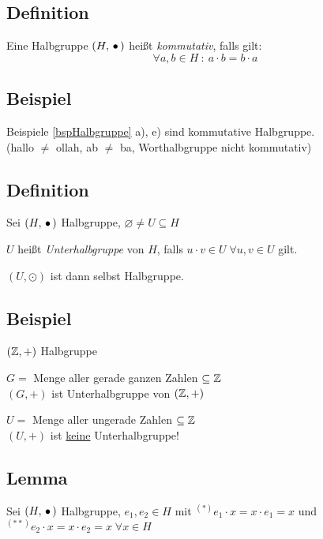  
 \subsection[Definition: kommutative Halbgruppe]{Definition}
 
 Eine Halbgruppe $(H, \,{\bullet}\,)$ heißt \emph{kommutativ}, falls gilt:
 \[ \tag{Kommutativgesetz, KG}
 \forall a, b \in H\::\: a \cdot b = b \cdot a \]
 
 \subsection{Beispiel}
 
 Beispiele \ref{bspHalbgruppe} a), e) sind kommutative Halbgruppe.
 \\ (hallo $\neq$ ollah, ab $\neq$ ba, Worthalbgruppe nicht kommutativ) 
 
 \subsection[Definition: Unterhalbgruppe]{Definition}
 
 Sei $(H, \,{\bullet}\,)$ Halbgruppe, $\varnothing \neq U \subseteq H$
 
 $U$ heißt \emph{Unterhalbgruppe} von $H$, falls $u \cdot v \in U \; \forall u, v \in U$ gilt.
 
 $(U, \odot)$ ist dann selbst Halbgruppe.
 
 \subsection{Beispiel}
 
 $(\mathbb{Z}, +)$ Halbgruppe
 
 $G =$ Menge aller gerade ganzen Zahlen $\subseteq \mathbb{Z}$
 \\$(G, +)$ ist Unterhalbgruppe von $(\mathbb{Z}, +)$
 
 $U =$ Menge aller ungerade Zahlen $\subseteq \mathbb{Z}$
 \\$(U, +)$ ist \underline{keine} Unterhalbgruppe!
 
 \subsection[Lemma: Eins eindeutig]{Lemma} \label{nullelemEindeutig}
 
 Sei $(H, \,{\bullet}\,)$ Halbgruppe, $e_1, e_2 \in H$ mit 
 $^{(*)} e_1 \cdot x = x \cdot e_1 = x$ und $^{(**)} e_2 \cdot x = x \cdot e_2 = x \; \forall x \in H$

